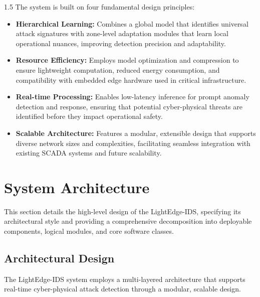 \begin{spacing}{1.5}
The system is built on four fundamental design principles:
\begin{itemize}
    \item \textbf{Hierarchical Learning:}  
    Combines a global model that identifies universal attack signatures with zone-level adaptation modules that learn local operational nuances, improving detection precision and adaptability.

    \item \textbf{Resource Efficiency:}  
    Employs model optimization and compression to ensure lightweight computation, reduced energy consumption, and compatibility with embedded edge hardware used in critical infrastructure.

    \item \textbf{Real-time Processing:}  
    Enables low-latency inference for prompt anomaly detection and response, ensuring that potential cyber-physical threats are identified before they impact operational safety.

    \item \textbf{Scalable Architecture:}  
    Features a modular, extensible design that supports diverse network sizes and complexities, facilitating seamless integration with existing SCADA systems and future scalability.
\end{itemize}


\newpage
\section{System Architecture}

This section details the high-level design of the LightEdge-IDS, specifying its architectural style and providing a comprehensive decomposition into deployable components, logical modules, and core software classes.

\subsection{Architectural Design}

The LightEdge-IDS system employs a multi-layered architecture that supports real-time cyber-physical attack detection through a modular, scalable design.

\begin{figure}[H]
\centering
{}
\end{figure}
\end{spacing}
